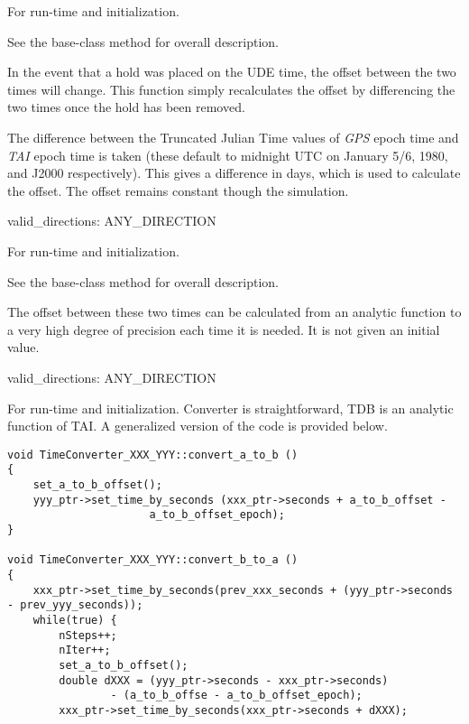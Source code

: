 {\begin{enumerate}
{\begin{enumerate}
For run-time and initialization.

See the base-class  method
for overall description.

In the event that a hold was placed on the UDE time, the offset between
the two times will change.  This function simply recalculates the
offset by differencing the two times once the hold has been removed.
\end{enumerate}}




The difference between the Truncated Julian Time values of \textit{GPS}
epoch time and \textit{TAI} epoch time is taken (these default to
midnight UTC on January 5/6, 1980, and J2000 respectively).  This gives
a difference in days, which is used to calculate the offset.  The
offset remains constant though the simulation.

{\begin{enumerate}
valid\_directions:
ANY\_DIRECTION

For run-time and initialization.

See the base-class  method
for overall description.


\end{enumerate}}


The offset between these two times can be calculated from an analytic
function to a very high degree of precision each time it is needed.  It
is not given an initial value.

{\begin{enumerate}
valid\_directions:
ANY\_DIRECTION

For run-time and initialization. Converter is straightforward, TDB is an
analytic function of TAI. A generalized version of the code is provided below.
\begin{verbatim}
void TimeConverter_XXX_YYY::convert_a_to_b ()
{
	set_a_to_b_offset();
	yyy_ptr->set_time_by_seconds (xxx_ptr->seconds + a_to_b_offset -
				      a_to_b_offset_epoch);
}

void TimeConverter_XXX_YYY::convert_b_to_a ()
{
	xxx_ptr->set_time_by_seconds(prev_xxx_seconds + (yyy_ptr->seconds - prev_yyy_seconds));
	while(true) {
		nSteps++;
		nIter++;
		set_a_to_b_offset();
		double dXXX = (yyy_ptr->seconds - xxx_ptr->seconds)
			    - (a_to_b_offse - a_to_b_offset_epoch);
		xxx_ptr->set_time_by_seconds(xxx_ptr->seconds + dXXX);


\end{verbatim}
\end{enumerate}}
\end{enumerate}}
